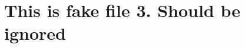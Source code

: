 \documentclass{article}
\begin{document}
\section*{This is fake file 3. Should be ignored}
\end{document}
